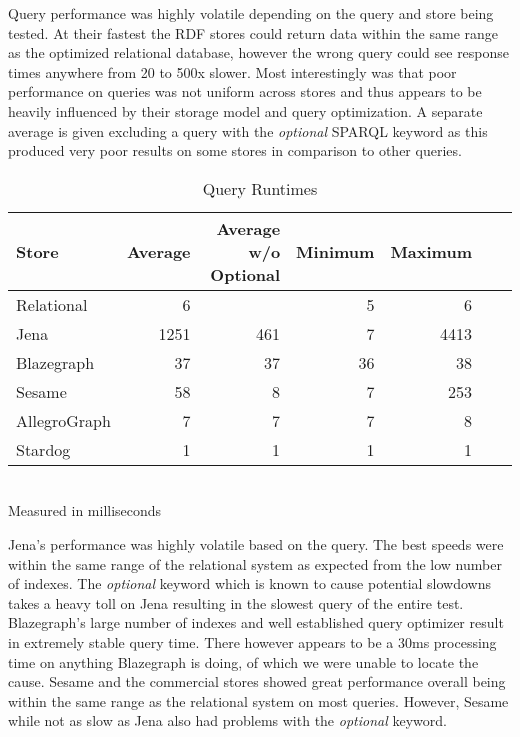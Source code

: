 \documentclass{llncs}
\begin{document}
Query performance was highly volatile depending on the query and store being tested.
At their fastest the RDF stores could return data within the same range as the optimized relational database, however the wrong query could see response times anywhere from 20 to 500x slower.
Most interestingly was that poor performance on queries was not uniform across stores and thus appears to be heavily influenced by their storage model and query optimization.
A separate average is given excluding a query with the \emph{optional} SPARQL keyword as this produced very poor results on some stores in comparison to other queries.

\vspace{-1.5em}
\begin{table}
\begin{center}
\caption{Query Runtimes}
\begin{tabular}{l | r | r | r | r | r | r}
    Store & Average & Average w/o Optional & Minimum & Maximum \\
\hline
Relational & 6 &  & 5 & 6 \\
Jena & 1251 & 461 & 7 & 4413  \\
Blazegraph & 37 & 37 & 36 & 38 \\
Sesame & 58 & 8 & 7 & 253  \\
AllegroGraph & 7 & 7 & 7 & 8 \\
Stardog & 1 & 1 & 1 & 1 \\
\end{tabular}
\\[5pt]
Measured in milliseconds
\end{center}
\end{table}
\vspace{-2em}

Jena's performance was highly volatile based on the query.
The best speeds were within the same range of the relational system as expected from the low number of indexes.
The \emph{optional} keyword which is known to cause potential slowdowns takes a heavy toll on Jena resulting in the slowest query of the entire test.
Blazegraph's large number of indexes and well established query optimizer result in extremely stable query time.
There however appears to be a 30ms processing time on anything Blazegraph is doing, of which we were unable to locate the cause.
Sesame and the commercial stores showed great performance overall being within the same range as the relational system on most queries. 
However, Sesame while not as slow as Jena also had problems with the \emph{optional} keyword.
\end{document}
